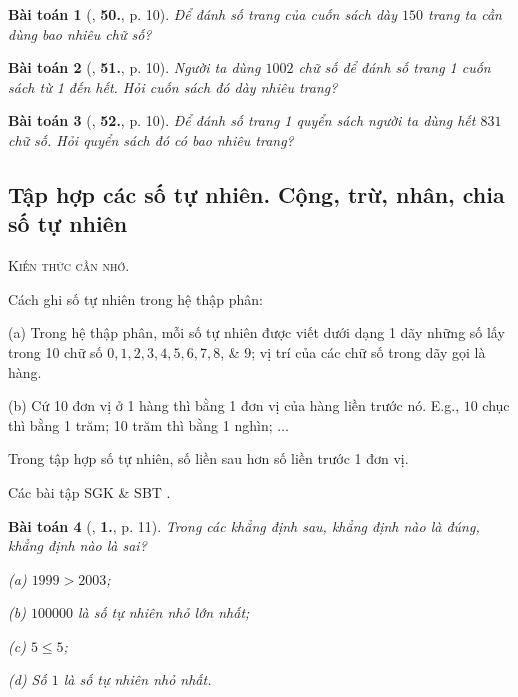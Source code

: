 \documentclass{article}
\numberwithin{equation}{section}
\newtheorem{baitoan}{Bài toán}[section]
\begin{document}
\begin{baitoan}[\cite{Trong_Toan_6_2021}, \textbf{50.}, p. 10]
	Để đánh số trang của cuốn sách dày $150$ trang ta cần dùng bao nhiêu chữ số?
\end{baitoan}

\begin{baitoan}[\cite{Trong_Toan_6_2021}, \textbf{51.}, p. 10]
	Người ta dùng $1002$ chữ số để đánh số trang 1 cuốn sách từ 1 đến hết. Hỏi cuốn sách đó dày nhiêu trang?
\end{baitoan}

\begin{baitoan}[\cite{Trong_Toan_6_2021}, \textbf{52.}, p. 10]
	Để đánh số trang 1 quyển sách người ta dùng hết $831$ chữ số. Hỏi quyển sách đó có bao nhiêu trang?
\end{baitoan}

\subsection{Tập hợp các số tự nhiên. Cộng, trừ, nhân, chia số tự nhiên}
\textsc{Kiến thức cần nhớ.}
\begin{tcolorbox}
	Cách ghi số tự nhiên trong hệ thập phân:
	\begin{enumerate*}
		\item[(a)] Trong hệ thập phân, mỗi số tự nhiên được viết dưới dạng 1 dãy những số lấy trong 10 chữ số $0,1,2,3,4,5,6,7,8$, \& $9$; vị trí của các chữ số trong dãy gọi là hàng.
		\item[(b)] Cứ 10 đơn vị ở 1 hàng thì bằng 1 đơn vị của hàng liền trước nó. E.g., $10$ chục thì bằng 1 trăm; 10 trăm thì bằng 1 nghìn; $\ldots$
	\end{enumerate*}
	Trong tập hợp số tự nhiên, số liền sau hơn số liền trước 1 đơn vị.
\end{tcolorbox}
Các bài tập SGK \cite[\textbf{1}--\textbf{4}, pp. 7--8]{SGK_Toan_6_Canh_Dieu_tap_1} \& SBT \cite[Ví dụ 1--3, pp. 7--8; \textbf{9}--\textbf{14}, pp. 8--9]{SBT_Toan_6_Canh_Dieu_tap_1}.

\begin{baitoan}[\cite{Trong_Toan_6_2021}, \textbf{1.}, p. 11]
	Trong các khẳng định sau, khẳng định nào là đúng, khẳng định nào là sai?
	\begin{enumerate*}
		\item[(a)] $1999 > 2003$;
		\item[(b)] $100000$ là số tự nhiên nhỏ lớn nhất;
		\item[(c)] $5\le 5$;
		\item[(d)] Số $1$ là số tự nhiên nhỏ nhất.
	\end{enumerate*}
\end{baitoan}
\end{document}
